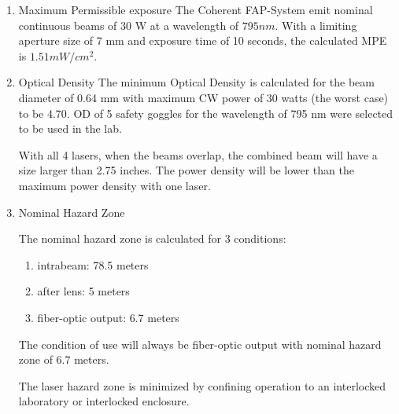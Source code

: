 \begin {enumerate}
\item {Maximum Permissible exposure}
The Coherent FAP-System
 emit nominal 
continuous beams of 30 W at a wavelength of $795 nm$.
With a limiting aperture size of 7 mm and exposure time of 10 seconds,
the calculated MPE is $1.51 mW/cm^2$.

\item {Optical Density}
The minimum Optical Density is calculated for the beam diameter of 0.64 mm
with maximum CW power of 30 watts (the worst case) to be 4.70. 
OD of 5 safety goggles for the wavelength of 795 nm were selected to be used in the lab.

With all 4 lasers, when the beams overlap, the 
combined beam will have a size larger than 2.75 inches. The power density will be lower than the maximum power density with one laser. 

\item {Nominal Hazard Zone}

The nominal hazard zone is calculated for 3 conditions:
\begin{enumerate}
\item {} intrabeam: 78.5 meters
\item {} after lens: 5 meters
\item {} fiber-optic output: 6.7 meters
\end{enumerate}
The condition of use will always be fiber-optic output with nominal hazard
zone of 6.7 meters.

The laser hazard zone is minimized by confining operation to an interlocked 
laboratory or interlocked enclosure.
\end{enumerate}


